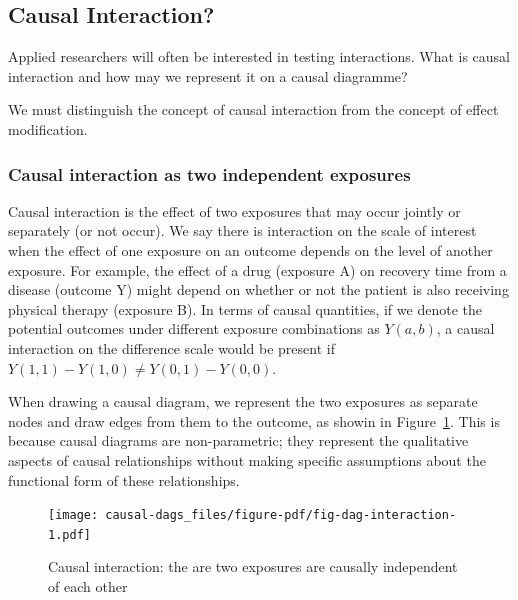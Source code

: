 \documentclass[
  singlecolumn]{report}
\begin{document}
\hypertarget{causal-interaction}{%
\subsection{Causal Interaction?}\label{causal-interaction}}

Applied researchers will often be interested in testing interactions.
What is causal interaction and how may we represent it on a causal
diagramme?

We must distinguish the concept of causal interaction from the concept
of effect modification.

\hypertarget{causal-interaction-as-two-independent-exposures}{%
\subsubsection{\texorpdfstring{\textbf{Causal interaction as two
independent
exposures}}{Causal interaction as two independent exposures}}\label{causal-interaction-as-two-independent-exposures}}

Causal interaction is the effect of two exposures that may occur jointly
or separately (or not occur). We say there is interaction on the scale
of interest when the effect of one exposure on an outcome depends on the
level of another exposure. For example, the effect of a drug (exposure
A) on recovery time from a disease (outcome Y) might depend on whether
or not the patient is also receiving physical therapy (exposure B). In
terms of causal quantities, if we denote the potential outcomes under
different exposure combinations as \(Y(a,b)\), a causal interaction on
the difference scale would be present if
\(Y(1,1) - Y(1,0) \neq Y(0,1) - Y(0,0)\).

When drawing a causal diagram, we represent the two exposures as
separate nodes and draw edges from them to the outcome, as showin in
Figure~\ref{fig-dag-interaction}. This is because causal diagrams are
non-parametric; they represent the qualitative aspects of causal
relationships without making specific assumptions about the functional
form of these relationships.

\begin{figure}

{\centering \texttt{[image: causal-dags\_files/figure-pdf/fig-dag-interaction-1.pdf]}

}

\caption{\label{fig-dag-interaction}Causal interaction: the are two
exposures are causally independent of each other}

\end{figure}
\end{document}
